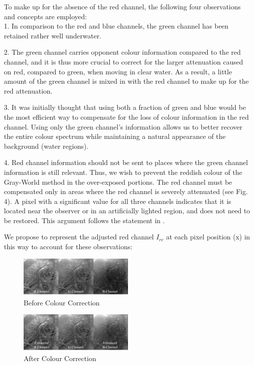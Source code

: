 \documentclass[conference]{IEEEtran}
\begin{document}
To make up for the absence of the red channel, the following four observations and concepts are employed:\\
1. In comparison to the red and blue channels, the green channel has been retained rather well underwater.\\\par
2. The green channel carries opponent colour information compared to the red channel, and it is thus more crucial to correct for the larger attenuation caused on red, compared to green, when moving in clear water. As a result, a little amount of the green channel is mixed in with the red channel to make up for the red attenuation. \\\par
3. It was initially thought that using both a fraction of green and blue would be the most efficient way to compensate for the loss of colour information in the red channel. Using only the green channel's information allows us to better recover the entire colour spectrum while maintaining a natural appearance of the background (water regions).\\\par
4. Red channel information should not be sent to places where the green channel information is still relevant. Thus, we wish to prevent the reddish colour of the Gray-World method in the over-exposed portions. The red channel must be compensated only in areas where the red channel is severely attenuated (see Fig. 4). A pixel with a significant value for all three channels indicates that it is located near the observer or in an artificially lighted region, and does not need to be restored. This argument follows the statement in \cite{drews2013transmission}.\\\par
We propose to represent the adjusted red channel $I_{rc}$ at each pixel position (x) in this way to account for these observations:\\

\begin{figure}
\includegraphics[width=0.5\textwidth]{8_Before Colour Correction.png}
\caption{Before Colour Correction}
\end{figure}

\begin{figure}
\includegraphics[width=0.5\textwidth]{9_After Colour Correction.png}
\caption{After Colour Correction}
\end{figure}
\end{document}
